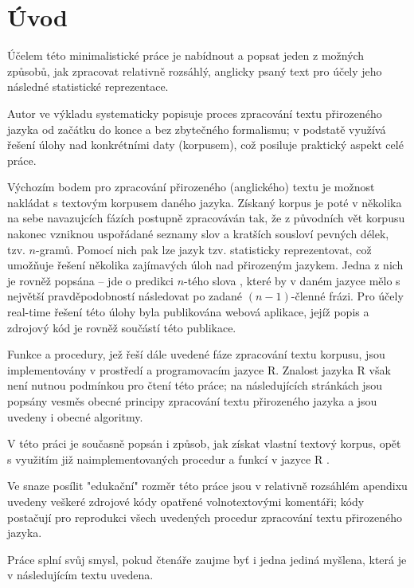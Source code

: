 
\section{Úvod}

Účelem této minimalistické práce je nabídnout a popsat jeden z možných
způsobů, jak zpracovat relativně rozsáhlý, anglicky psaný text pro účely
jeho následné statistické reprezentace.

Autor ve výkladu systematicky popisuje proces zpracování textu přirozeného
jazyka od začátku do konce a bez zbytečného formalismu; v podstatě využívá
řešení úlohy nad konkrétními daty (korpusem), což posiluje praktický
aspekt celé práce.

Výchozím bodem pro zpracování přirozeného (anglického) textu je možnost
nakládat s textovým korpusem daného jazyka. Získaný korpus je poté v několika
na sebe navazujcích fázích postupně zpracováván tak, že z původních vět
korpusu nakonec vzniknou uspořádané seznamy slov a kratších sousloví
pevných délek, tzv. $n$-gramů. Pomocí nich pak lze jazyk
tzv. statisticky
reprezentovat, což umožňuje řešení několika zajímavých úloh nad přirozeným
jazykem. Jedna z nich je rovněž popsána -- jde o predikci $n$-tého slova%
,
které by v daném jazyce mělo s největší pravděpodobností následovat po
zadané $(n - 1)$-členné frázi. Pro účely
real-time řešení této úlohy byla
publikována webová aplikace, jejíž popis a zdrojový kód je rovněž součástí
této publikace.

Funkce a procedury, jež řeší dále uvedené fáze zpracování textu korpusu, 
jsou implementovány v prostředí a programovacím jazyce \textsf{R}.
Znalost jazyka \textsf{R} však není nutnou podmínkou pro
čtení této práce;
na následujících stránkách jsou popsány vesměs obecné principy zpracování
textu přirozeného jazyka a jsou uvedeny i obecné algoritmy.

V této práci je současně popsán i způsob, jak získat vlastní textový korpus,
opět s využitím již naimplementovaných procedur a funkcí v jazyce \textsf{R}%
.

Ve snaze posílit "edukační" rozměr této práce jsou v relativně rozsáhlém
apendixu uvedeny veškeré zdrojové kódy opatřené volnotextovými komentáři;
kódy postačují pro reprodukci všech uvedených procedur zpracování
textu přirozeného jazyka.

Práce splní svůj smysl, pokud čtenáře zaujme byť i jedna jediná myšlena,
která je v následujícím textu uvedena.


\newpage







